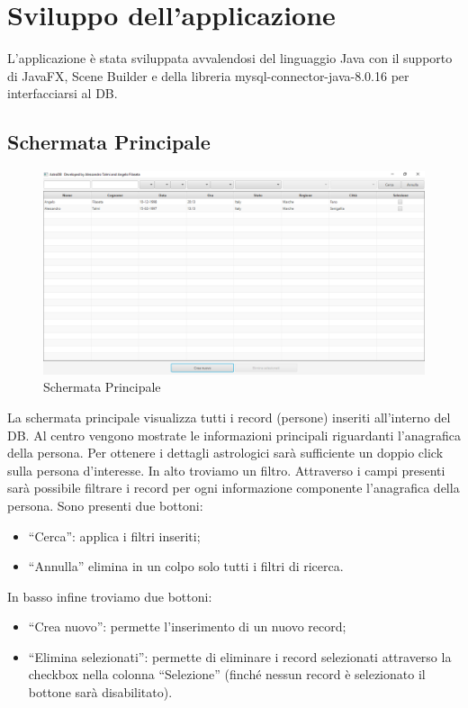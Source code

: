 \chapter{Sviluppo dell'applicazione}
L’applicazione è stata sviluppata avvalendosi del linguaggio Java con il supporto di JavaFX, Scene Builder e della libreria mysql-connector-java-8.0.16 per interfacciarsi al DB.\newline

\section{Schermata Principale}
\begin{figure}[H]
\centering
\includegraphics[width=\textwidth, height=0.35\textheight, keepaspectratio]{img/c5/MainView.png}
\caption{Schermata Principale}
\label{fig:mainview}
\end{figure}
La schermata principale visualizza tutti i record (persone) inseriti all’interno del DB.\newline
Al centro vengono mostrate le informazioni principali riguardanti l’anagrafica della persona. Per ottenere i dettagli astrologici sarà sufficiente un doppio click sulla persona d’interesse.\newline
In alto troviamo un filtro. Attraverso i campi presenti sarà possibile filtrare i record per ogni informazione componente l’anagrafica della persona. Sono presenti due bottoni:
\begin{itemize}
\item “Cerca”: applica i filtri inseriti;
\item “Annulla” elimina in un colpo solo tutti i filtri di ricerca.
\end{itemize}
In basso infine troviamo due bottoni:
\begin{itemize}
\item “Crea nuovo”: permette l’inserimento di un nuovo record;
\item “Elimina selezionati”: permette di eliminare i record selezionati attraverso la checkbox nella colonna “Selezione” (finché nessun record è selezionato il bottone sarà disabilitato).
\end{itemize}

